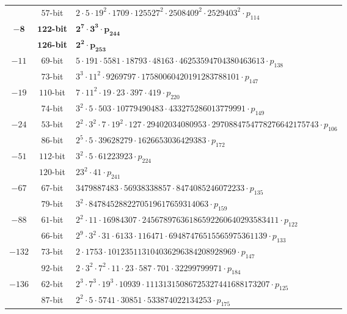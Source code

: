 \documentclass{article}
\theoremstyle{definition}
\begin{document}
\begin{table*}[!ht]
\begin{tabularx}{\textwidth}{ccl}
 & $57$-bit & $2  \cdot 5  \cdot 19^{2}  \cdot 1709  \cdot 125527^{2}  \cdot 2508409^{2}  \cdot 2529403^{2}  \cdot p_{114}$\\
$\mathbf{-8}$ & $\mathbf{122}$\textbf{-bit} & $\mathbf{2^{7}  \cdot 3^{3}  \cdot p_{244}}$\\
 & $\mathbf{126}$\textbf{-bit} & $\mathbf{2^{2}  \cdot p_{253}}$\\
$-11$ & $69$-bit & $5  \cdot 191  \cdot 5581  \cdot 18793  \cdot 48163  \cdot 46253594704380463613  \cdot p_{138}$\\
 & $73$-bit & $3^{3}  \cdot 11^{2}  \cdot 9269797  \cdot 17580060420191283788101  \cdot p_{147}$\\
$-19$ & $110$-bit & $7  \cdot 11^{2}  \cdot 19  \cdot 23  \cdot 397  \cdot 419  \cdot p_{220}$\\
 & $74$-bit & $3^{2}  \cdot 5  \cdot 503  \cdot 10779490483  \cdot 433275286013779991  \cdot p_{149}$\\
$-24$ & $53$-bit & $2^{2}  \cdot 3^{2}  \cdot 7  \cdot 19^{2}  \cdot 127  \cdot 29402034080953  \cdot 2970884754778276642175743  \cdot p_{106}$\\
 & $86$-bit & $2^{5}  \cdot 5  \cdot 39628279  \cdot 1626653036429383  \cdot p_{172}$\\
$-51$ & $112$-bit & $3^{2}  \cdot 5  \cdot 61223923  \cdot p_{224}$\\
 & $120$-bit & $23^{2}  \cdot 41  \cdot p_{241}$\\
$-67$ & $67$-bit & $3479887483  \cdot 56938338857  \cdot 8474085246072233  \cdot p_{135}$\\
 & $79$-bit & $3^{2}  \cdot 8478452882270519617659314063  \cdot p_{159}$\\
$-88$ & $61$-bit & $2^{2}  \cdot 11  \cdot 16984307  \cdot 24567897636186592260640293583411  \cdot p_{122}$\\
 & $66$-bit & $2^{9}  \cdot 3^{2}  \cdot 31  \cdot 6133  \cdot 116471  \cdot 69487476515565975361139  \cdot p_{133}$\\
$-132$ & $73$-bit & $2  \cdot 1753  \cdot 101235113104036296384208928969  \cdot p_{147}$\\
 & $92$-bit & $2  \cdot 3^{2}  \cdot 7^{2}  \cdot 11  \cdot 23  \cdot 587  \cdot 701  \cdot 32299799971  \cdot p_{184}$\\
$-136$ & $62$-bit & $2^{3}  \cdot 7^{3}  \cdot 19^{3}  \cdot 10939  \cdot 11131315086725327441688173207  \cdot p_{125}$\\
 & $87$-bit & $2^{2}  \cdot 5  \cdot 5741  \cdot 30851  \cdot 533874022134253  \cdot p_{175}$\\

\end{tabularx}
\end{table*}
\end{document}
